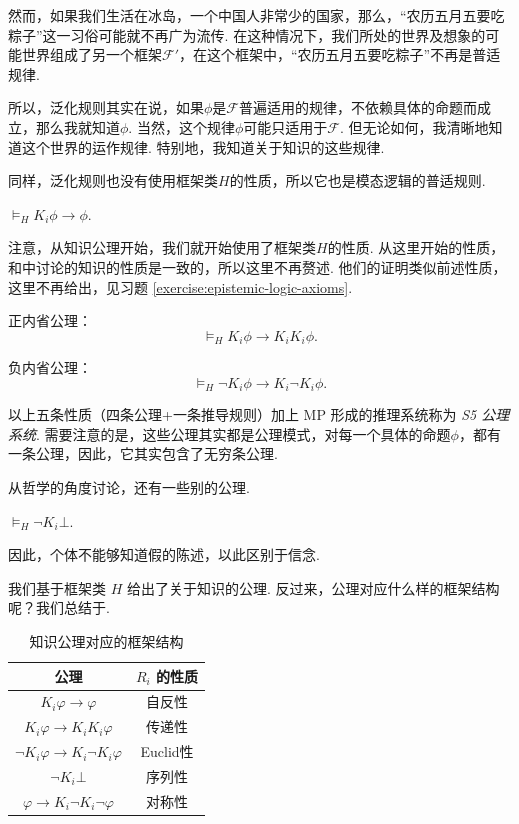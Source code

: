 然而，如果我们生活在冰岛，一个中国人非常少的国家，那么，“农历五月五要吃粽子”这一习俗可能就不再广为流传. 在这种情况下，我们所处的世界及想象的可能世界组成了另一个框架$\mathcal F'$，在这个框架中，“农历五月五要吃粽子”不再是普适规律. 

所以，泛化规则其实在说，如果$\phi$是$\mathcal F$普遍适用的规律，不依赖具体的命题而成立，那么我就知道$\phi$. 当然，这个规律$\phi$可能只适用于$\mathcal F$. 但无论如何，我清晰地知道这个世界的运作规律. 特别地，我知道关于知识的这些规律. 

同样，泛化规则也没有使用框架类$H$的性质，所以它也是模态逻辑的普适规则. 

\begin{proposition}\label{prop:knowledge-axiom}
$\vDash_H K_i\phi\to\phi$.
\end{proposition}

注意，从知识公理开始，我们就开始使用了框架类$H$的性质. 从这里开始的性质，和中讨论的知识的性质是一致的，所以这里不再赘述. 他们的证明类似前述性质，这里不再给出，见习题 \ref{exercise:epistemic-logic-axioms}.

\begin{proposition}[内省公理]\label{prop:knowledge-introspection}
正内省公理：
\[\vDash_H K_i\phi\to K_iK_i\phi.\]

负内省公理：
\[\vDash_H \neg K_i\phi\to K_i\neg K_i\phi.\]
\end{proposition}

以上五条性质（四条公理+一条推导规则）加上 MP 形成的推理系统称为 \textit{S5 公理系统}. 需要注意的是，这些公理其实都是公理模式，对每一个具体的命题$\phi$，都有一条公理，因此，它其实包含了无穷条公理. 

从哲学的角度讨论，还有一些别的公理. 

\begin{proposition}[一致性公理]\label{prop:knowledge-consistency}
$\vDash_H\neg K_i\bot$.
\end{proposition}

因此，个体不能够知道假的陈述，以此区别于信念. 

我们基于框架类 $H$ 给出了关于知识的公理. 反过来，公理对应什么样的框架结构呢？我们总结于.

\begin{table}[ht]
\centering
    \begin{tabular}{c|c}
        \toprule 公理 &  $R_i$ 的性质 \\
        \midrule $K_i \varphi \to \varphi$ & 自反性 \\
        $K_i \varphi \to K_i K_i \varphi$ & 传递性 \\
        $\neg K_i \varphi \to K_i \neg K_i \varphi$ & Euclid性 \\
        $\neg K_i\bot$  & 序列性\\
        $\varphi \to K_i \neg K_i \neg \varphi$ & 对称性 \\
        \bottomrule
    \end{tabular}
    \caption{知识公理对应的框架结构} \label{tab:epistemic-axiom-structure}
\end{table}

